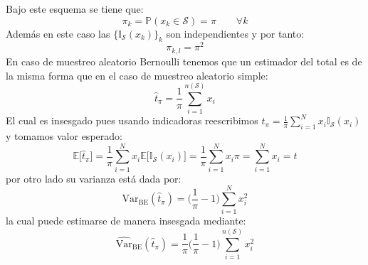 \documentclass[
]{book}
\newenvironment{Shaded}{\begin{snugshade}}{\end{snugshade}}
\newcommand{\AttributeTok}[1]{\textcolor[rgb]{0.77,0.63,0.00}{#1}}
\newcommand{\ControlFlowTok}[1]{\textcolor[rgb]{0.13,0.29,0.53}{\textbf{#1}}}
\newcommand{\DecValTok}[1]{\textcolor[rgb]{0.00,0.00,0.81}{#1}}
\newcommand{\FunctionTok}[1]{\textcolor[rgb]{0.00,0.00,0.00}{#1}}
\newcommand{\NormalTok}[1]{#1}
\newcommand{\OtherTok}[1]{\textcolor[rgb]{0.56,0.35,0.01}{#1}}
\newcommand{\SpecialCharTok}[1]{\textcolor[rgb]{0.00,0.00,0.00}{#1}}
\newcommand{\StringTok}[1]{\textcolor[rgb]{0.31,0.60,0.02}{#1}}
\begin{document}
\begin{Shaded}
\end{Shaded}

Bajo este esquema se tiene que:
\[
\pi_k = \mathbb{P}(x_k \in \mathcal{S}) = \pi \qquad \forall k
\]
Además en este caso las \(\{ \mathbb{I}_{\mathcal{S}}(x_k) \}_k\) son independientes y por tanto:
\[
\pi_{k,l} = \pi^2
\]
En caso de muestreo aleatorio Bernoulli tenemos que un estimador del total es de la misma forma que en el caso de muestreo aleatorio simple:
\[
\hat{t}_{\pi} = \frac{1}{\pi} \sum\limits_{i = 1}^{n(\mathcal{S})} x_i
\]
El cual es insesgado pues usando indicadoras reescribimos \(\hat{t}_{\pi} = \frac{1}{\pi} \sum\limits_{i = 1}^N x_i \mathbb{I}_{\mathcal{S}}(x_i)\) y tomamos valor esperado:
\[
\mathbb{E}\Big[ \hat{t}_{\pi} \Big] = \frac{1}{\pi} \sum\limits_{i = 1}^N x_i \mathbb{E}\Big[\mathbb{I}_{\mathcal{S}}(x_i)\Big] =\frac{1}{\pi}\sum\limits_{i = 1}^N x_i\pi = \sum\limits_{i = 1}^N x_i = t
\]
por otro lado su varianza está dada por:
\[
\textrm{Var}_{\text{BE}}(\hat{t}_{\pi}) = \Big( \frac{1}{\pi} - 1\Big)\sum\limits_{i = 1}^N x_i^2
\]
la cual puede estimarse de manera insesgada mediante:
\[
\widehat{\textrm{Var}}_{\text{BE}}(\hat{t}_{\pi}) = \frac{1}{\pi}\Big( \frac{1}{\pi} - 1\Big)\sum\limits_{i = 1}^{n(\mathcal{S})} x_i^2
\]
\end{document}
